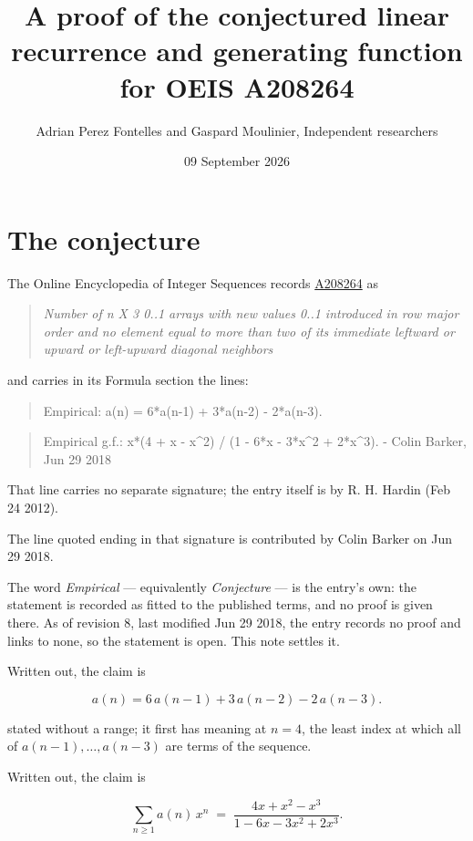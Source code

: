 \documentclass[11pt]{article}
\title{A proof of the conjectured linear recurrence and generating function for OEIS A208264}
\author{Adrian Perez Fontelles and Gaspard Moulinier, Independent researchers}
\date{09 September 2026}
\theoremstyle{definition}
\begin{document}
\maketitle
\section{The conjecture}

The Online Encyclopedia of Integer Sequences records \href{https://oeis.org/A208264}{A208264} as

\begin{quote}\itshape Number of n X 3 0..1 arrays with new values 0..1 introduced in row major order and no element equal to more than two of its immediate leftward or upward or left-upward diagonal neighbors\end{quote}

and carries in its Formula section the lines:

\begin{quote}\ttfamily Empirical: a(n) = 6*a(n-1) + 3*a(n-2) - 2*a(n-3).\end{quote}

\begin{quote}\ttfamily Empirical g.f.: x*(4 + x - x\textasciicircum{}2) / (1 - 6*x - 3*x\textasciicircum{}2 + 2*x\textasciicircum{}3). - Colin Barker, Jun 29 2018\end{quote}

That line carries no separate signature; the entry itself is by R. H. Hardin (Feb 24 2012).

The line quoted ending in that signature is contributed by Colin Barker on Jun 29 2018.

The word {\itshape Empirical} --- equivalently {\itshape Conjecture} --- is the entry's own: the statement is recorded as fitted to the published terms, and no proof is given there. As of revision 8, last modified Jun 29 2018, the entry records no proof and links to none, so the statement is open. This note settles it.

Written out, the claim is

\[a(n) = 6\,a(n-1) + 3\,a(n-2) - 2\,a(n-3).\]

stated without a range; it first has meaning at $n = 4$, the least index at which all of $a(n-1),\dots,a(n-3)$ are terms of the sequence.

Written out, the claim is

\[\sum_{n \ge 1} a(n)\,x^n \;=\; \frac{4x + x^{2} - x^{3}}{1 - 6x - 3x^{2} + 2x^{3}}.\]
\end{document}
